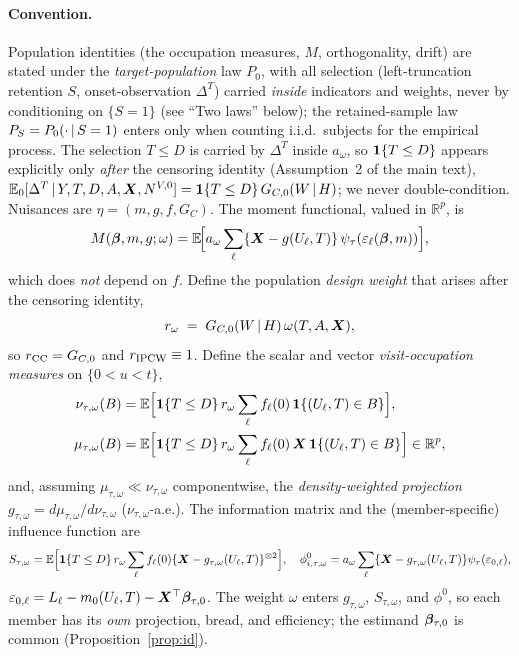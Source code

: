 \paragraph{Convention.} Population identities (the occupation measures, $M$,
orthogonality, drift) are stated under the \emph{target-population} law $P_0$,
with all selection (left-truncation retention $S$, onset-observation $\Delta^T$)
carried \emph{inside} indicators and weights, never by conditioning on $\{S=1\}$
(see ``Two laws'' below); the retained-sample law $P_S=P_0(\cdot\,\vert\, S=1)$
enters only when counting i.i.d.\ subjects for the empirical process. The
selection $T\le D$ is carried by $\Delta^T$ inside $a_\omega$, so $\mathbf{1}\{T\le D\}$
appears explicitly only \emph{after} the censoring identity (Assumption~2 of the
main text),
$\mathbb{E}_0[\Delta^T\,\vert\, Y,T,D,A,\bm{X},N^{V,0}]=\mathbf{1}\{T\le D\}\,G_{C,0}(W\,\vert\, H)$; we
never double-condition. Nuisances are $\eta=(m,g,f,G_C)$. The moment
functional, valued in $\mathbb R^p$, is
\begin{equation}
M(\bm{\beta},m,g;\omega)=\mathbb{E}\!\Big[a_\omega\sum_{\ell}\{\bm{X}-g(U_\ell,T)\}\,
   \psi_\tau(\varepsilon_\ell(\bm{\beta},m))\Big],
\label{eq:M}
\end{equation}
which does \emph{not} depend on $f$. Define the population \emph{design weight}
that arises after the censoring identity,
\begin{equation}
r_{\omega} \;=\; G_{C,0}(W\,\vert\, H)\,\omega(T,A,\bm{X}),
\label{eq:rom}
\end{equation}
so $r_{\rm CC}=G_{C,0}$ and $r_{\rm IPCW}\equiv1$. Define the scalar and vector
\emph{visit-occupation measures} on $\{0<u<t\}$,
\begin{align}
\nu_{\tau,\omega}(B)&=\mathbb{E}\Big[\mathbf{1}\{T\le D\}\,r_{\omega}\sum_\ell f_\ell(0)\,
   \mathbf{1}\{(U_\ell,T)\in B\}\Big],\label{eq:nu}\\
\mu_{\tau,\omega}(B)&=\mathbb{E}\Big[\mathbf{1}\{T\le D\}\,r_{\omega}\sum_\ell f_\ell(0)\,\bm{X}\,
   \mathbf{1}\{(U_\ell,T)\in B\}\Big]\in\mathbb R^p,\label{eq:mu}
\end{align}
and, assuming $\mu_{\tau,\omega}\ll\nu_{\tau,\omega}$ componentwise, the
\emph{density-weighted projection}
$g_{\tau,\omega}=d\mu_{\tau,\omega}/d\nu_{\tau,\omega}$ ($\nu_{\tau,\omega}$-a.e.).
The information matrix and the (member-specific) influence function are
\begin{equation}
S_{\tau,\omega}=\mathbb{E}\Big[\mathbf{1}\{T\le D\}\,r_{\omega}\sum_\ell f_\ell(0)
   \{\bm{X}-g_{\tau,\omega}(U_\ell,T)\}^{\otimes2}\Big],\quad
\phi^0_{i,\tau,\omega}=a_\omega\sum_\ell\{\bm{X}-g_{\tau,\omega}(U_\ell,T)\}
   \psi_\tau(\varepsilon_{0,\ell}),
\label{eq:Sphi}
\end{equation}
$\varepsilon_{0,\ell}=L_\ell-m_0(U_\ell,T)-\bm{X}^\top\bm{\beta}_{\tau,0}$. The weight
$\omega$ enters $g_{\tau,\omega}$, $S_{\tau,\omega}$, and $\phi^0$, so each
member has its \emph{own} projection, bread, and efficiency; the estimand
$\bm{\beta}_{\tau,0}$ is common (Proposition~\ref{prop:id}).

